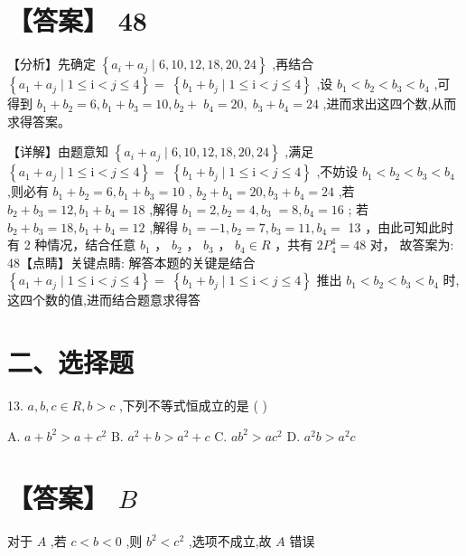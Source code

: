 \documentclass[10pt]{article}
\begin{document}
\section*{【答案】 48}

【分析】先确定 \(\left\{  {{a}_{i} + {a}_{j} \mid  6,{10},{12},{18},{20},{24}}\right\}\) ,再结合 \(\left\{  {{a}_{1} + {a}_{j} \mid  1 \leq  \mathrm{i} < j \leq  4}\right\}   = \; \left\{  {{b}_{1} + {b}_{j} \mid  1 \leq  \mathrm{i} < j \leq  4}\right\}\) ,设 \({b}_{1} < {b}_{2} < {b}_{3} < {b}_{4}\) ,可得到 \({b}_{1} + {b}_{2} = 6,{b}_{1} + {b}_{3} = {10},{b}_{2} + \; {b}_{4} = {20},\;{b}_{3} + {b}_{4} = {24}\) ,进而求出这四个数,从而求得答案。

【详解】由题意知 \(\left\{  {{a}_{i} + {a}_{j} \mid  6,{10},{12},{18},{20},{24}}\right\}\) ,满足 \(\left\{  {{a}_{1} + {a}_{j} \mid  1 \leq  \mathrm{i} < j \leq  4}\right\}   = \; \left\{  {{b}_{1} + {b}_{j} \mid  1 \leq  \mathrm{i} < j \leq  4}\right\}\) ,不妨设 \({b}_{1} < {b}_{2} < {b}_{3} < {b}_{4}\) ,则必有 \({b}_{1} + {b}_{2} = 6,{b}_{1} + {b}_{3} = {10}\) , \({b}_{2} + {b}_{4} = {20},{b}_{3} + {b}_{4} = {24}\) ,若 \({b}_{2} + {b}_{3} = {12},{b}_{1} + {b}_{4} = {18}\) ,解得 \({b}_{1} = 2,{b}_{2} = 4,{b}_{3} \; = 8,{b}_{4} = {16}\) ; 若 \({b}_{2} + {b}_{3} = {18},{b}_{1} + {b}_{4} = {12}\) ,解得 \({b}_{1} =  - 1,{b}_{2} = 7,{b}_{3} = {11},{b}_{4} =\) 13 ，由此可知此时有 2 种情况，结合任意 \({b}_{1}\) ， \({b}_{2}\) ， \({b}_{3}\) ， \({b}_{4} \in  R\) ，共有 \(2{P}_{4}^{4} = {48}\) 对， 故答案为: 48【点睛】关键点睛: 解答本题的关键是结合 \(\left\{  {{a}_{1} + {a}_{j} \mid  1 \leq  \mathrm{i} < j \leq  4}\right\}   = \; \left\{  {{b}_{1} + {b}_{j} \mid  1 \leq  \mathrm{i} < j \leq  4}\right\}\) 推出 \({b}_{1} < {b}_{2} < {b}_{3} < {b}_{4}\) 时,这四个数的值,进而结合题意求得答

\section*{二、选择题}

13. \(a,b,c \in  R,b > c\) ,下列不等式恒成立的是 ( )

A. \(a + {b}^{2} > a + {c}^{2}\) B. \({a}^{2} + b > {a}^{2} + c\) C. \(a{b}^{2} > a{c}^{2}\) D. \({a}^{2}b > {a}^{2}c\)

\section*{【答案】 \(B\)}

对于 \(A\) ,若 \(c < b < 0\) ,则 \({b}^{2} < {c}^{2}\) ,选项不成立,故 \(A\) 错误
\end{document}
